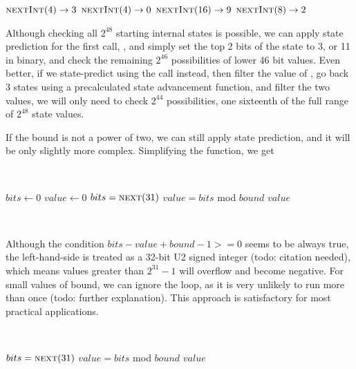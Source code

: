 \documentclass{article}
\begin{document}
\begin{algorithmic}
    \State $\Call{nextInt}{4} \to 3$
    \State $\Call{nextInt}{4} \to 0$
    \State $\Call{nextInt}{16} \to 9$
    \State $\Call{nextInt}{8} \to 2$\\
\end{algorithmic}

\noindent Although checking all $2^{48}$ starting internal states is possible, we can apply state prediction for the first call, , and simply set the top 2 bits of the state to 3, or 11 in binary, and check the remaining $2^{46}$ possibilities of lower 46 bit values. 
Even better, if we state-predict using the  call instead, then filter the value of , go back 3 states using a precalculated state advancement function, and filter the two  values, we will only need to check $2^{44}$ possibilities, one sixteenth of the full range of $2^{48}$ state values. %

If the  bound is not a power of two, we can still apply state prediction, and it will be only slightly more complex. Simplifying the  function, we get

\
\begin{algorithmic}
    \State $bits \gets 0$
    \State $value \gets 0$
    \Repeat
        \State $bits = \Call{next}{31}$
        \State $value = bits$ mod $bound$
    \State \Return $value$
\EndFunction
\end{algorithmic}
\ \

Although the condition $bits - value + bound - 1 >= 0$ seems to be always true, the left-hand-side is treated as a 32-bit U2 signed integer (todo: citation needed), which means values greater than $2^{31} - 1$ will overflow and become negative. For small values of bound, we can ignore the loop, as it is very unlikely to run more than once (todo: further explanation). This approach is satisfactory for most practical applications. 

\
\begin{algorithmic}
\Function{nextInt}{$bound$}
    \State $bits = \Call{next}{31}$
    \State $value = bits$ mod $bound$
    \State \Return $value$
\EndFunction
\end{algorithmic}
\ \
\end{document}
